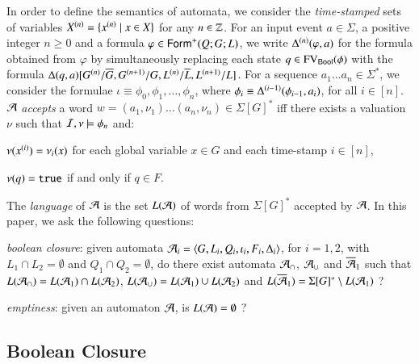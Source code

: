 \documentclass{llncs}
\begin{document}
In order to define the semantics of automata, we consider the
\emph{time-stamped} sets of variables ${X}^{({n})} = \{{x}^{({n})}
\mid x \in X\}$ for any $n\in{\bf \mathbb{Z}}$. For an input event $a \in \Sigma$,
a positive integer $n\geq0$ and a formula $\varphi\in\mathsf{Form}^+(Q;G;L)$,
we write ${\Delta}^{({n})}(\varphi,a)$ for the formula obtained from
$\varphi$ by simultaneously replacing each state $q \in
\mathrm{FV}_{\mathsf{Bool}}(\phi)$ with the formula
$\Delta(q,a)[{G}^{({n})}/\overline{G}, {G}^{({n+1})}/G,
  {L}^{({n})}/\overline{L}, {L}^{({n+1})}/L]$. For a sequence $a_1
\ldots a_n \in \Sigma^*$, we consider the formulae \(\iota \equiv
\phi_0, \phi_1, \ldots, \phi_n \), where $\phi_{i} \equiv
{\Delta}^{({i-1})}(\phi_{i-1},a_{i})$, for all $i \in [n]$. $\mathcal{A}$
\emph{accepts} a word $w = (a_1,\nu_1) \ldots (a_n,\nu_n) \in
\Sigma[G]^*$ iff there exists a valuation $\nu$ such that
$\mathcal{I},\nu \models \phi_n$ and: \begin{compactitem}
%
\item $\nu({x}^{({i})}) = \nu_i(x)$ for each global variable $x\in G$
  and each time-stamp $i \in [n]$,
%
\item $\nu(q) = \mathtt{true}$ if and only if $q \in F$. 
\end{compactitem}
The \emph{language} of $\mathcal{A}$ is the set $L(\mathcal{A})$ of words from
$\Sigma[G]^*$ accepted by $\mathcal{A}$. In this paper, we ask the following
questions: \begin{compactenum}
\item \emph{boolean closure}: given automata $\mathcal{A}_i =
  \langle G,L_i,Q_i,\iota_i,F_i,\Delta_i \rangle$, for $i=1,2$, with $L_1 \cap
  L_2 = \emptyset$ and $Q_1 \cap Q_2 = \emptyset$, do there exist
  automata $\mathcal{A}_\cap$, $\mathcal{A}_\cup$ and $\overline{\mathcal{A}}_1$ such that
  $L(\mathcal{A}_\cap) = L(\mathcal{A}_1) \cap L(\mathcal{A}_2)$, $L(\mathcal{A}_\cup) = L(\mathcal{A}_1) \cup
  L(\mathcal{A}_2)$ and $L(\overline{\mathcal{A}}_1) = \Sigma[G]^* \setminus L(\mathcal{A}_1)$ ?
%
\item \emph{emptiness}: given an automaton $\mathcal{A}$, is $L(\mathcal{A}) =
  \emptyset$ ?
\end{compactenum}

\subsection{Boolean Closure} 
\end{document}
